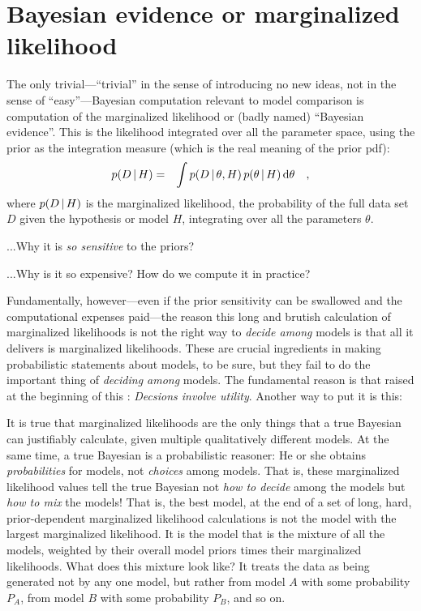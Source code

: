 \documentclass[12pt,twoside]{article}
\newcommand{\data}{D}
\newcommand{\pars}{\theta}
\begin{document}
\section{Bayesian evidence or marginalized likelihood}

The only trivial---``trivial'' in the sense of introducing no new
ideas, not in the sense of ``easy''---Bayesian computation
relevant to model comparison is computation of the marginalized
likelihood or (badly named) ``Bayesian evidence''.  This is the likelihood
integrated over all the parameter space, using the prior as the
integration measure (which is the real meaning of the prior
pdf):
\begin{eqnarray}
p(\data\given H) &=& \int p(\data\given\pars, H)\,p(\pars\given H)\,\dd\pars
\quad,
\end{eqnarray}
where $p(\data\given H)$ is the marginalized likelihood, the
probability of the full data set $\data$ given the hypothesis or model
$H$, integrating over all the parameters $\pars$.

...Why it is \emph{so sensitive} to the priors?

...Why is it so expensive?  How do we compute it in practice?

Fundamentally, however---even if the prior sensitivity can be
swallowed and the computational expenses paid---the reason this long
and brutish calculation of marginalized likelihoods is not the right
way to \emph{decide among} models is that all it delivers is
marginalized likelihoods.  These are crucial ingredients in making
probabilistic statements about models, to be sure, but they fail to do
the important thing of \emph{deciding among} models.  The fundamental
reason is that raised at the beginning of this \documentname:
\emph{Decsions involve utility}.  Another way to put it is this:

It is true that marginalized likelihoods are the only things that a
true Bayesian can justifiably calculate, given multiple qualitatively
different models.  At the same time, a true Bayesian is a
probabilistic reasoner: He or she obtains \emph{probabilities} for
models, not \emph{choices} among models.  That is, these marginalized
likelihood values tell the true Bayesian not \emph{how to decide}
among the models but \emph{how to mix} the models!  That is, the best
model, at the end of a set of long, hard, prior-dependent marginalized
likelihood calculations is not the model with the largest marginalized
likelihood.  It is the model that is the mixture of all the models,
weighted by their overall model priors times their marginalized
likelihoods.  What does this mixture look like?  It treats the data as
being generated not by any one model, but rather from model $A$ with
some probability $P_A$, from model $B$ with some probability $P_B$,
and so on.
\end{document}
